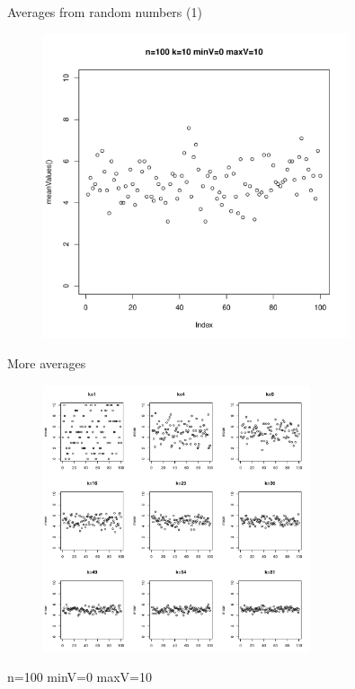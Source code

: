 \documentclass[pdf]{beamer}
\begin{document}
\begin{frame}{Averages from random numbers (1)}

\begin{figure}[ht]
  \includegraphics[width=0.8\textwidth]{images/averages1}
\end{figure}
\end{frame}

\begin{frame}{More averages}

\begin{figure}[ht]
  \includegraphics[width=0.7\textwidth]{images/averages2}
\end{figure}
\small  n=100 minV=0 maxV=10
\end{frame}
\end{document}
